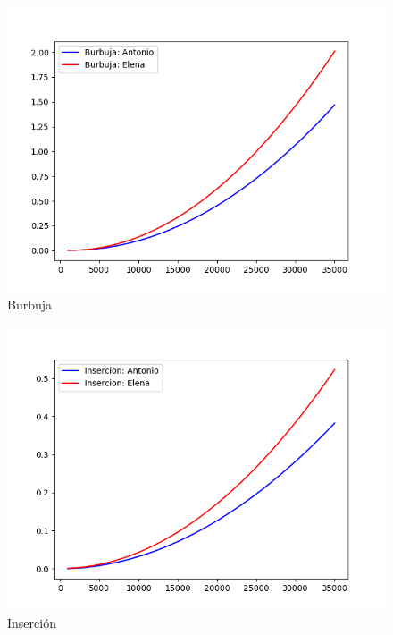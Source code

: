 \documentclass[11pt]{article}
\begin{document}
\begin{figure}
\centering
\includegraphics[scale=0.7]{../graficos/distintos/burbuja.png}
\caption{Burbuja}
\end{figure}

\begin{figure}
\centering
\includegraphics[scale=0.7]{../graficos/distintos/insercion.png}
\caption{Inserción}
\end{figure}
\end{document}

